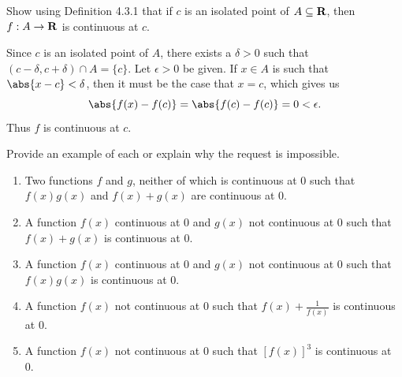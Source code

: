 \documentclass{lew98_solutions}
\begin{document}
\begin{exercise}
\label{ex:4.3.5}
    Show using Definition 4.3.1 that if \( c \) is an isolated point of \( A \subseteq \mathbf{R} \), then \( f : A \to \mathbf{R} \) is continuous at \( c \).
\end{exercise}

\begin{solution}
    Since \( c \) is an isolated point of \( A \), there exists a \( \delta > 0 \) such that \( (c - \delta, c + \delta) \cap A = \{ c \} \). Let \( \epsilon > 0 \) be given. If \( x \in A \) is such that \( \abs{x - c} < \delta \), then it must be the case that \( x = c \), which gives us
    \[
        \abs{f(x) - f(c)} = \abs{f(c) - f(c)} = 0 < \epsilon.
    \]
    Thus \( f \) is continuous at \( c \).
\end{solution}

\begin{exercise}
\label{ex:4.3.6}
    Provide an example of each or explain why the request is impossible.
    \begin{enumerate}
        \item Two functions \( f \) and \( g \), neither of which is continuous at 0 such that \( f(x)g(x) \) and \( f(x) + g(x) \) are continuous at 0.

        \item A function \( f(x) \) continuous at 0 and \( g(x) \) not continuous at 0 such that \( f(x) + g(x) \) is continuous at 0.

        \item A function \( f(x) \) continuous at 0 and \( g(x) \) not continuous at 0 such that \( f(x)g(x) \) is continuous at 0.

        \item A function \( f(x) \) not continuous at 0 such that \( f(x) + \tfrac{1}{f(x)} \) is continuous at 0.

        \item A function \( f(x) \) not continuous at 0 such that \( [f(x)]^3 \) is continuous at 0.
    \end{enumerate}
\end{exercise}
\end{document}
